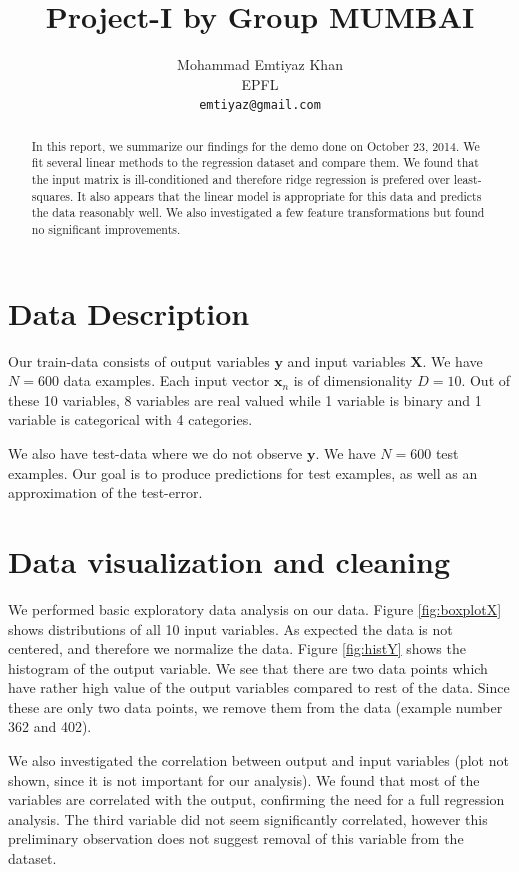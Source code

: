 \documentclass{article} %
\title{Project-I by Group MUMBAI}
\author{
Mohammad Emtiyaz Khan\\
EPFL \\
\texttt{emtiyaz@gmail.com} \\
}
\begin{document}
\maketitle

\begin{abstract}
In this report, we summarize our findings for the demo done on October 23, 2014.
We fit several linear methods to the regression dataset and compare them.
We found that the input matrix is ill-conditioned and therefore ridge regression is prefered over least-squares. It also appears that the linear model is appropriate for this data and predicts the data reasonably well. We also investigated a few feature transformations but found no significant improvements.
\end{abstract}

\section{Data Description}
Our train-data consists of output variables $\mathbf{y}$ and input variables $\mathbf{X}$. We have $N=600$ data examples. Each input vector $\mathbf{x}_n$ is of dimensionality $D=10$. Out of these 10 variables, 8 variables are real valued while 1 variable is binary and 1 variable is categorical with 4 categories.

We also have test-data where we do not observe $\mathbf{y}$. We have $N=600$ test examples. Our goal is to produce predictions for test examples, as well as an approximation of the test-error.

\section{Data visualization and cleaning}
We performed basic exploratory data analysis on our data. Figure \ref{fig:boxplotX} shows distributions of all 10 input variables. As expected the data is not centered, and therefore we normalize the data. Figure \ref{fig:histY} shows the histogram of the output variable. We see that there are two data points which have rather high value of the output variables compared to rest of the data. Since these are only two data points, we remove them from the data (example number 362 and 402).

We also investigated the correlation between output and input variables (plot not shown, since it is not important for our analysis). We found that most of the variables are correlated with the output, confirming the need for a full regression analysis. The third variable did not seem significantly correlated, however this preliminary observation does not suggest removal of this variable from the dataset.
\end{document}

